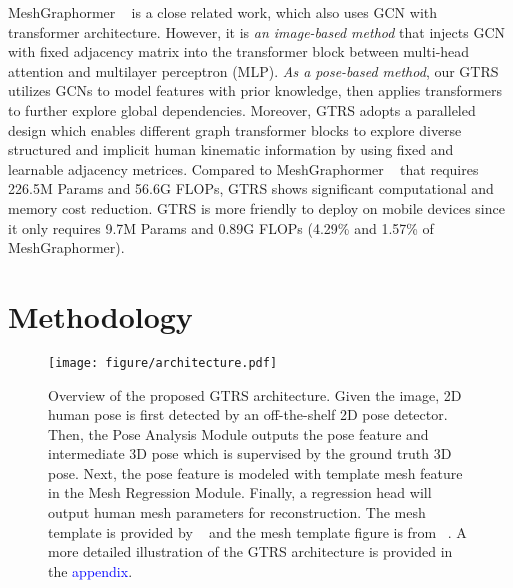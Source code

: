 \documentclass[sigconf]{acmart}
\begin{document}
MeshGraphormer ~\cite{lin2021_mesh_graphormer} is a {close related work}, which also uses GCN with transformer architecture. However, it is \textit{an image-based method} that injects GCN with fixed adjacency matrix into the transformer block between multi-head attention and multilayer perceptron (MLP). \textit{As a pose-based method}, our GTRS utilizes GCNs to model features with prior knowledge, then applies transformers to further explore global dependencies. Moreover, GTRS adopts a paralleled design which enables different graph transformer blocks to explore diverse structured and implicit human kinematic information by using fixed and learnable adjacency metrices.   
Compared to MeshGraphormer ~\cite{lin2021_mesh_graphormer} that requires 226.5M Params and 56.6G FLOPs, GTRS shows significant computational and memory cost reduction. GTRS is more friendly to deploy on mobile devices since it only requires 9.7M Params and 0.89G FLOPs (4.29\% and 1.57\% of MeshGraphormer).   





\section{Methodology}

\begin{figure*}[htp]
\vspace{-5pt}
  \centering
  \texttt{[image: figure/architecture.pdf]}
  \vspace{-8pt}
  \caption{\small{Overview of the proposed GTRS architecture. Given the image, 2D human pose is first detected by an off-the-shelf 2D pose detector. Then, the Pose Analysis Module outputs the pose feature and intermediate 3D pose which is supervised by the ground truth 3D pose.  Next, the pose feature is modeled with template mesh feature in the Mesh Regression Module. Finally, a regression head will output human mesh parameters for reconstruction. The mesh template is provided by ~\cite{Kolotouros2019SPIN} and the mesh template figure is from ~\cite{lin2021metro}. A more detailed illustration of the GTRS architecture is provided in the \textcolor{blue}{appendix}.}}
  \label{fig:architecture}
  \vspace{-5pt}
\end{figure*}
\end{document}
